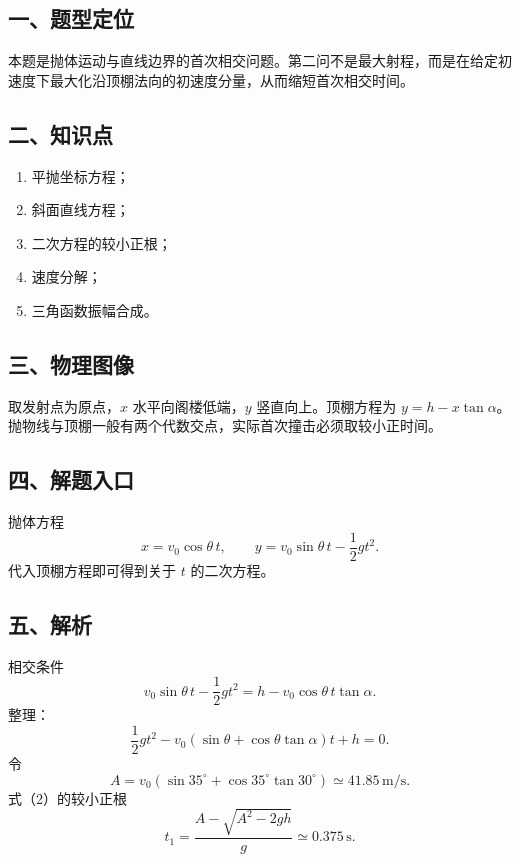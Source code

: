 \documentclass[12pt,a4paper,UTF8]{ctexart}
\newcommand{\tightlist}{\setlength{\itemsep}{0pt}\setlength{\parskip}{0pt}}
\begin{document}
\subsection{一、题型定位}\label{ux4e00ux9898ux578bux5b9aux4f4d-1}

本题是抛体运动与直线边界的首次相交问题。第二问不是最大射程，而是在给定初速度下最大化沿顶棚法向的初速度分量，从而缩短首次相交时间。

\subsection{二、知识点}\label{ux4e8cux77e5ux8bc6ux70b9-1}

\begin{enumerate}
\def\labelenumi{\arabic{enumi}.}
\tightlist
\item
  平抛坐标方程；
\item
  斜面直线方程；
\item
  二次方程的较小正根；
\item
  速度分解；
\item
  三角函数振幅合成。
\end{enumerate}

\subsection{三、物理图像}\label{ux4e09ux7269ux7406ux56feux50cf-1}

取发射点为原点，\(x\) 水平向阁楼低端，\(y\) 竖直向上。顶棚方程为
\(y=h-x\tan\alpha\)。抛物线与顶棚一般有两个代数交点，实际首次撞击必须取较小正时间。

\subsection{四、解题入口}\label{ux56dbux89e3ux9898ux5165ux53e3-1}

抛体方程 \[
x=v_0\cos\theta\,t,\qquad
y=v_0\sin\theta\,t-\frac12gt^2. \tag{1}
\] 代入顶棚方程即可得到关于 \(t\) 的二次方程。

\subsection{五、解析}\label{ux4e94ux89e3ux6790-1}

相交条件 \[
v_0\sin\theta\,t-\frac12gt^2
=h-v_0\cos\theta\,t\tan\alpha.
\] 整理： \[
\frac12gt^2
-v_0(\sin\theta+\cos\theta\tan\alpha)t+h=0. \tag{2}
\] 令 \[
A=v_0(\sin35^\circ+\cos35^\circ\tan30^\circ)
\simeq41.85\,\mathrm{m/s}.
\] 式（2）的较小正根 \[
t_1=\frac{A-\sqrt{A^2-2gh}}g
\simeq0.375\,\mathrm s. \tag{3}
\]
\end{document}
